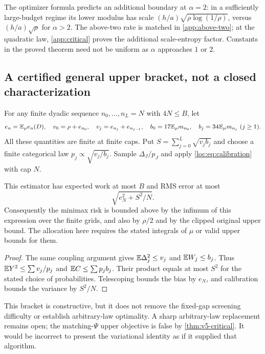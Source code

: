 The optimizer formula predicts an additional boundary at $\alpha=2$: in a sufficiently large-budget regime its lower modulus has scale $(h/a)\sqrt{\rho\log(1/\rho)}$, versus $(h/a)\sqrt\rho$ for $\alpha>2$. The above-two rate is matched in \cref{app:above-two}; at the quadratic
law, \cref{app:critical} proves the additional scale-entropy factor. Constants in the proved theorem need not be uniform as $\alpha$ approaches $1$ or $2$.

\subsection{A certified general upper bracket, not a closed characterization}
For any finite dyadic sequence $n_0,\ldots,n_L=N$ with $4N\le B$, let
\[
 e_n=\mathbb E_\mu e_n(D),\quad
 v_0=\rho+e_{n_0},\quad v_j=e_{n_j}+e_{n_{j-1}},\quad
 b_0=17\mathbb E_\mu m_{n_0},\quad b_j=34\mathbb E_\mu m_{n_j}\ (j\ge1).
\]
All these quantities are finite at finite caps. Put
$S=\sum_{j=0}^L\sqrt{v_jb_j}$ and choose a finite categorical law
$p_j\propto\sqrt{v_j/b_j}$. Sample $\Delta_J/p_J$ and apply \eqref{loc:eq:calibration} with cap $N$.
\begin{proposition}\label{loc:prop:generalupper}
This estimator has expected work at most $B$ and RMS error at most
\[
 \sqrt{e_N^2+S^2/N}.
\]
Consequently the minimax risk is bounded above by the infimum of this expression over the finite grids, and also by $\rho/2$ and by the clipped original upper bound. The allocation here requires the stated integrals of $\mu$ or valid upper bounds for them.
\end{proposition}
\begin{proof}
The same coupling argument gives $\mathbb E\Delta_j^2\le v_j$ and $\mathbb E W_j\le b_j$. Thus
$\mathbb E Y^2\le\sum v_j/p_j$ and $\mathbb E C\le\sum p_jb_j$. Their product equals at most $S^2$ for the stated choice of probabilities. Telescoping bounds the bias by $e_N$, and calibration bounds the variance by $S^2/N$.
\end{proof}

This bracket is constructive, but it does not remove the fixed-gap screening difficulty or establish arbitrary-law optimality. A sharp arbitrary-law replacement remains open; the matching-$\Psi$
upper objective is false by \cref{thm:v5-critical}. It would be incorrect to present the variational identity as if it supplied that algorithm.
